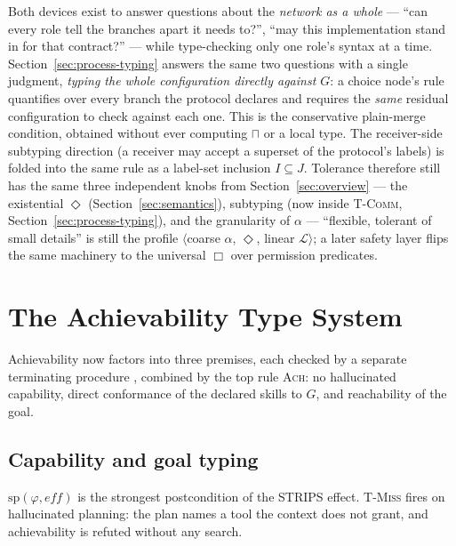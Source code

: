 \documentclass{article}
\theoremstyle{plain}
\theoremstyle{definition}
\newcommand{\pre}{\mathit{pre}}
\newcommand{\eff}{\mathit{eff}}
\newcommand{\seither}{\mathrm{sp}}
\newcommand{\dom}{\mathrm{dom}}
\def \bgc {}
\def \egc {}
\begin{document}
Both devices exist to answer questions about the \emph{network as a whole} ---
``can every role tell the branches apart it needs to?'', ``may this
implementation stand in for that contract?'' --- while type-checking only one
role's syntax at a time. Section~\ref{sec:process-typing} answers the same two
questions with a single
judgment, \emph{typing the whole configuration directly against $G$}: a choice
node's rule quantifies over every branch the protocol declares and requires the
\emph{same} residual configuration to check against each one. This is the
conservative plain-merge condition, obtained without ever computing $\sqcap$ or
a local type. The receiver-side subtyping direction (a receiver may accept a
superset of the protocol's labels) is folded into the same rule as a label-set
inclusion $I\subseteq J$. Tolerance therefore still has the same three
independent knobs from Section~\ref{sec:overview} --- the existential $\Diamond$
(Section~\ref{sec:semantics}), subtyping (now inside \textsc{T-Comm},
Section~\ref{sec:process-typing}), and the granularity of $\alpha$ --- ``flexible,
tolerant of small details'' is still the profile $\langle$coarse $\alpha$,
$\Diamond$, linear $\mathcal L\rangle$; a later safety layer flips the same
machinery to the universal $\Box$ over permission predicates.

\section{The Achievability Type System}\label{app:types}

Achievability now factors into three premises, 
\bgc each checked by a separate terminating procedure \egc,
combined by the top rule \textsc{Ach}: no hallucinated capability, direct
conformance of the declared skills to $G$, and reachability of the goal.

\subsection{Capability and goal typing}
$\seither(\varphi,\eff)$ is the strongest postcondition of the STRIPS effect.
\textsc{T-Miss} fires on hallucinated planning: the plan names a tool the context
does not grant, and achievability is refuted without any search.
\end{document}
